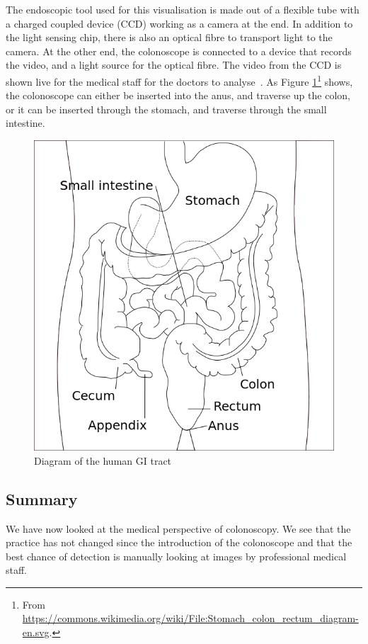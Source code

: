 The endoscopic tool used for this visualisation is made out of a flexible tube with a charged coupled device (CCD) working as a camera at the end. In addition to the light sensing chip, there is also an optical fibre to transport light to the camera. At the other end, the colonoscope is connected to a device that records the video, and a light source for the optical fibre. The video from the CCD is shown live for the medical staff for the doctors to analyse~\cite{Colonoscope}.
As Figure \ref{fig:HumanGI}\footnote{From \url{https://commons.wikimedia.org/wiki/File:Stomach_colon_rectum_diagram-en.svg}.} shows, the colonoscope can either be inserted into the anus, and traverse up the colon, or it can be inserted through the stomach, and traverse through the small intestine.


\begin{figure}[h]
	\centering
	\includegraphics[scale=0.4]{background/figures/Stomach_colon_rectum_diagram.png}
	\caption{Diagram of the human GI tract}
	\label{fig:HumanGI} 
\end{figure}



\subsection{Summary}
We have now looked at the medical perspective of colonoscopy. We see that the practice has not changed since the introduction of the colonoscope and that the best chance of detection is manually looking at images by professional medical staff. 


